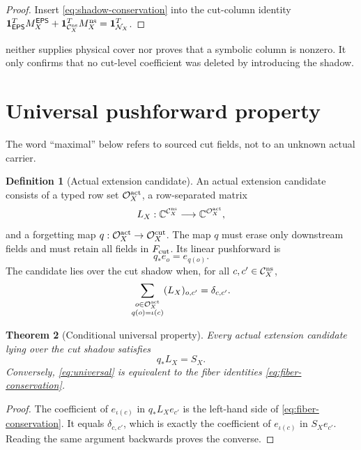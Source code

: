 \documentclass[11pt]{article}
\newtheorem{theorem}{Theorem}[section]
\theoremstyle{definition}
\newtheorem{definition}[theorem]{Definition}
\theoremstyle{remark}
\newcommand{\EPS}{\mathsf{EPS}}
\newcommand{\Cns}{\mathcal C_X^{\rm ns}}
\newcommand{\Ocut}{\mathcal O_X^{\rm cut}}
\newcommand{\Oact}{\mathcal O_X^{\rm act}}
\newcommand{\one}{\mathbf 1}
\begin{document}
\begin{proof}
Insert \eqref{eq:shadow-conservation} into the cut-column identity
\(\one_{\EPS}^{T}M_X^{\EPS}
+\one_{\Cns}^{T}M_X^{\rm ns}=\one_{\mathcal N_X}^{T}\).
\end{proof}

 neither supplies physical cover nor proves
that a symbolic column is nonzero.  It only confirms that no
cut-level coefficient was deleted by introducing the shadow.

\section{Universal pushforward property}

The word ``maximal'' below refers to sourced cut fields, not to an
unknown actual carrier.

\begin{definition}[Actual extension candidate]
An actual extension candidate consists of a typed row set \(\Oact\),
a row-separated matrix
\[
 L_X:\mathbb C^{\Cns}\longrightarrow\mathbb C^{\Oact},
\]
and a forgetting map \(q:\Oact\to\Ocut\).  The map \(q\) must erase
only downstream fields and must retain all fields in
\(F_{\rm cut}\).  Its linear pushforward is
\[
 q_*e_o=e_{q(o)}.
\]
The candidate lies over the cut shadow when, for all \(c,c'\in\Cns\),
\begin{equation}
 \sum_{\substack{o\in\Oact\\q(o)=\iota(c)}}(L_X)_{o,c'}
 =\delta_{c,c'}.
 \label{eq:fiber-conservation}
\end{equation}
\end{definition}

\begin{theorem}[Conditional universal property]
\label{thm:universal}
Every actual extension candidate lying over the cut shadow satisfies
\begin{equation}
 q_*L_X=S_X.
 \label{eq:universal}
\end{equation}
Conversely, \eqref{eq:universal} is equivalent to the fiber identities
\eqref{eq:fiber-conservation}.
\end{theorem}

\begin{proof}
The coefficient of \(e_{\iota(c)}\) in \(q_*L_Xe_{c'}\) is the
left-hand side of \eqref{eq:fiber-conservation}.  It equals
\(\delta_{c,c'}\), which is exactly the coefficient of
\(e_{\iota(c)}\) in \(S_Xe_{c'}\).  Reading the same argument
backwards proves the converse.
\end{proof}
\end{document}
